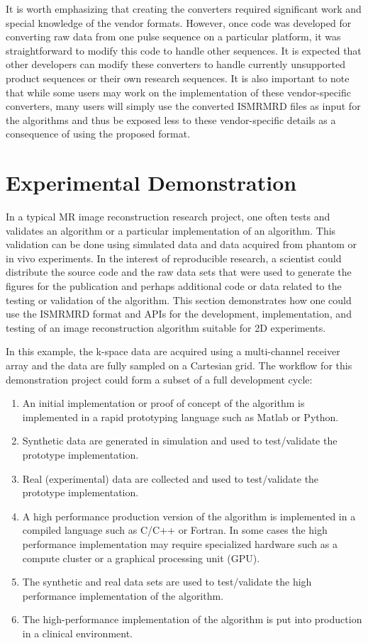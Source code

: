 \documentclass[12pt]{article}
\begin{document}
It is worth emphasizing that creating the converters required significant work and special knowledge of the vendor formats. However, once code was developed for converting raw data from one pulse sequence on a particular platform, it was straightforward to modify this code to handle other sequences. It is expected that other developers can modify these converters to handle currently unsupported product sequences or their own research sequences. It is also important to note that while some users may work on the implementation of these vendor-specific converters, many users will simply use the converted ISMRMRD files as input for the algorithms and thus be exposed less to these vendor-specific details as a consequence of using the proposed format. 

\section*{Experimental Demonstration}
In a typical MR image reconstruction research project, one often tests and validates an algorithm or a particular implementation of an algorithm. This validation can be done using simulated data and data acquired from phantom or in vivo experiments.  In the interest of reproducible research, a scientist could distribute the source code and the raw data sets that were used to generate the figures for the publication and perhaps additional code or data related to the testing or validation of the algorithm.
This section demonstrates how one could use the ISMRMRD format and APIs for the development, implementation, and testing of an image reconstruction algorithm suitable for 2D experiments.

In this example, the k-space data are acquired using a multi-channel receiver array and the data are fully sampled on a Cartesian grid.  The workflow for this demonstration project could form a subset of a full development cycle:
\begin{enumerate}
\item An initial implementation or proof of concept of the algorithm is implemented in a rapid prototyping language such as Matlab or Python.
\item Synthetic data are generated in simulation and used to test/validate the prototype implementation.
\item Real (experimental) data are collected and used to test/validate the prototype implementation.
\item A high performance production version of the algorithm is implemented in a compiled language such as C/C++ or Fortran.  In some cases the high performance implementation may require specialized hardware such as a compute cluster or a graphical processing unit (GPU).
\item The synthetic and real data sets are used to test/validate the high performance implementation of the algorithm.
\item The high-performance implementation of the algorithm is put into production in a clinical environment.
\end{enumerate}
\end{document}
